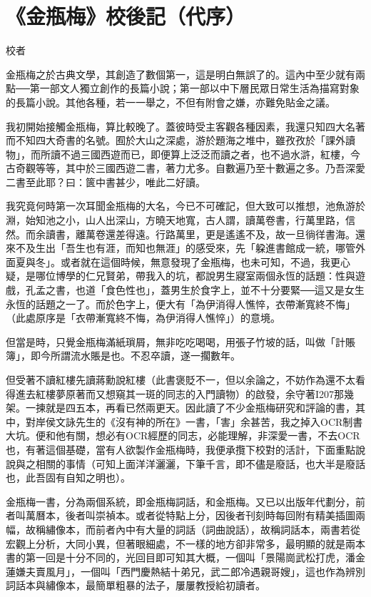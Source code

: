 \chapter*{《金瓶梅》校後記（代序）}

\begin{declareqianyan}
校者\qquad\ 
\end{declareqianyan}	

金瓶梅之於古典文學，其創造了數個第一，這是明白無誤了的。這內中至少就有兩點──第一部文人獨立創作的長篇小說；第一部以中下層民眾日常生活為描寫對象的長篇小說。其他各種，若一一舉之，不但有附會之嫌，亦難免貼金之議。

我初開始接觸金瓶梅，算比較晚了。蓋彼時受主客觀各種因素，我還只知四大名著而不知四大奇書的名號。囿於大山之深處，游於題海之堆中，雖孜孜於「課外讀物」，而所讀不過三國西遊而已，即便算上泛泛而讀之者，也不過水滸，紅樓，今古奇觀等等，其中於三國西遊二書，著力尤多。自數遍乃至十數遍之多。乃吾深愛二書至此耶？曰：篋中書甚少，唯此二好讀。

我究竟何時第一次耳聞金瓶梅的大名，今已不可確記，但大致可以推想，池魚游於淵，始知池之小，山人出深山，方曉天地寬，古人謂，讀萬卷書，行萬里路，信然。而余讀書，離萬卷還差得遠。行路萬里，更是遙遙不及，故一旦徜徉書海。還來不及生出「吾生也有涯，而知也無涯」的感受來，先「躱進書館成一統，哪管外面夏與冬」。或者就在這個時候，無意發現了金瓶梅，也未可知，不過，我更心疑，是哪位博學的仁兄賢弟，帶我入的坑，都說男生寢室兩個永恆的話題：性與遊戲，孔孟之書，也道「食色性也」，蓋男生於食字上，並不十分要緊──這又是女生永恆的話題之一了。而於色字上，便大有「為伊消得人憔悴，衣帶漸寬終不悔」（此處原序是「衣帶漸寬終不悔，為伊消得人憔悴」）的意境。

但當是時，只覺金瓶梅滿紙瑣屑，無非吃吃喝喝，用張子竹坡的話，叫做「計賬簿」，即今所謂流水賬是也。不忍卒讀，遂一擱數年。

但受著不讀紅樓先讀蔣勳說紅樓（此書褒貶不一，但以余論之，不妨作為還不太看得進去紅樓夢原著而又想窺其一斑的同志的入門讀物）的啟發，余守著I207那幾架。一揀就是四五本，再看已然兩更天。因此讀了不少金瓶梅研究和評論的書，其中，對岸侯文詠先生的《沒有神的所在》一書，「害」余甚苦，我之掉入OCR制書大坑。便和他有關，想必有OCR經歷的同志，必能理解，非深愛一書，不去OCR也，有著這個基礎，當有人欲製作金瓶梅時，我便承攬下校對的活計，下面重點說說與之相關的事情（可知上面洋洋灑灑，下筆千言，即不儘是廢話，也大半是廢話也，此吾固有自知之明也）。

金瓶梅一書，分為兩個系統，即金瓶梅詞話，和金瓶梅。又已以出版年代劃分，前者叫萬曆本，後者叫崇禎本。或者從特點上分，因後者刊刻時每回附有精美插圖兩幅，故稱繡像本，而前者內中有大量的詞話（詞曲說話），故稱詞話本，兩書若從宏觀上分析，大同小異，但著眼細處，不一樣的地方卻非常多，最明顯的就是兩本書的第一回是十分不同的，光回目即可知其大概，一個叫「景陽崗武松打虎，潘金蓮嫌夫賣風月」，一個叫「西門慶熱結十弟兄，武二郎冷遇親哥嫂」，這也作為辨別詞話本與繡像本，最簡單粗暴的法子，屢屢教授給初讀者。


